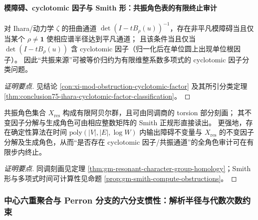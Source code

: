 \paragraph{模障碍、cyclotomic 因子与 Smith 形：共振角色表的有限终止审计}

\begin{conclusion}\label{con:xi-mod-obstruction-cyclotomic-equivalence}
对 Ihara/动力学 \(\zeta\) 的扭曲通道 \(\det(I-tB_\rho(u))^{-1}\)，存在非平凡模障碍当且仅当某个 \(\rho\neq \mathbf{1}\) 使相应谱半径达到平凡通道；
且该条件当且仅当 \(\det(I-tB_\rho(u))\) 含 cyclotomic 因子（归一化后在单位圆上出现单位根因子）。
因此“共振来源”可被等价归约为有限维整系数多项式的 cyclotomic 因子分类问题。
\end{conclusion}
\begin{proof}[证明要点]
见结论 \ref{con:xi-mod-obstruction-cyclotomic-factor} 及其所引分类定理 \ref{thm:conclusion75-ihara-cyclotomic-factor-classification}。
\end{proof}

\begin{conclusion}\label{con:xi-resonant-character-snf-computable}
共振角色集合 \(X_{\mathrm{res}}\) 构成有限阿贝尔群，且可由同调商的 torsion 部分刻画；
其不变因子分解与生成角色可由相应整数矩阵的 Smith 正规形直接读出。
更强地，存在确定性算法在时间 \(\mathrm{poly}(|V|,|E|,\log W)\) 内输出障碍不变量与 \(X_{\mathrm{res}}\) 的不变因子分解及生成角色，从而“是否存在 cyclotomic 因子/共振通道”的全角色审计可在有限步内终止。
\end{conclusion}
\begin{proof}[证明要点]
同调刻画见定理 \ref{thm:gm-resonant-character-group-homology}；Smith 形与多项式时间可计算性见命题 \ref{prop:gm-smith-compute-obstructions}。
\end{proof}

\subsubsection{中心六重聚合与 Perron 分支的六分支惯性：解析半径与代数次数约束}

